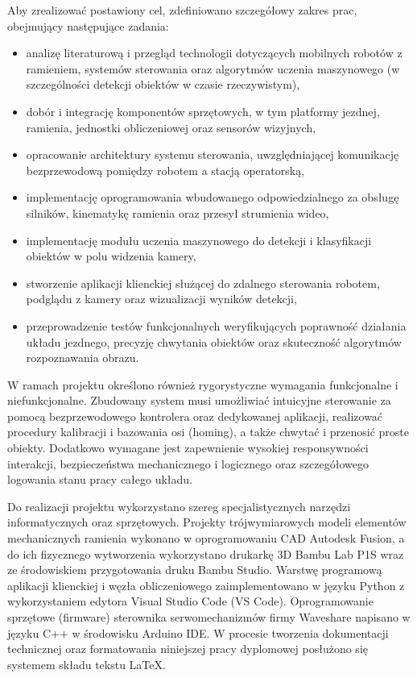 \documentclass[11pt]{extreport}
\begin{document}
Aby zrealizować postawiony cel, zdefiniowano szczegółowy zakres prac, obejmujący następujące zadania:
\begin{itemize}
    \item analizę literaturową i przegląd technologii dotyczących mobilnych robotów z ramieniem, systemów sterowania oraz algorytmów uczenia maszynowego (w szczególności detekcji obiektów w czasie rzeczywistym),
    \item dobór i integrację komponentów sprzętowych, w tym platformy jezdnej, ramienia, jednostki obliczeniowej oraz sensorów wizyjnych,
    \item opracowanie architektury systemu sterowania, uwzględniającej komunikację bezprzewodową pomiędzy robotem a stacją operatorską,
    \item implementację oprogramowania wbudowanego odpowiedzialnego za obsługę silników, kinematykę ramienia oraz przesył strumienia wideo,
    \item implementację modułu uczenia maszynowego do detekcji i klasyfikacji obiektów w polu widzenia kamery,
    \item stworzenie aplikacji klienckiej służącej do zdalnego sterowania robotem, podglądu z kamery oraz wizualizacji wyników detekcji,
    \item przeprowadzenie testów funkcjonalnych weryfikujących poprawność działania układu jezdnego, precyzję chwytania obiektów oraz skuteczność algorytmów rozpoznawania obrazu.
\end{itemize}

W ramach projektu określono również rygorystyczne wymagania funkcjonalne i niefunkcjonalne. Zbudowany system musi umożliwiać intuicyjne sterowanie za pomocą bezprzewodowego kontrolera oraz dedykowanej aplikacji, realizować procedury kalibracji i bazowania osi (homing), a także chwytać i przenosić proste obiekty. Dodatkowo wymagane jest zapewnienie wysokiej responsywności interakcji, bezpieczeństwa mechanicznego i logicznego oraz szczegółowego logowania stanu pracy całego układu.

Do realizacji projektu wykorzystano szereg specjalistycznych narzędzi informatycznych oraz sprzętowych. Projekty trójwymiarowych modeli elementów mechanicznych ramienia wykonano w oprogramowaniu CAD Autodesk Fusion, a do ich fizycznego wytworzenia wykorzystano drukarkę 3D Bambu Lab P1S wraz ze środowiskiem przygotowania druku Bambu Studio. Warstwę programową aplikacji klienckiej i węzła obliczeniowego zaimplementowano w języku Python z wykorzystaniem edytora Visual Studio Code (VS Code). Oprogramowanie sprzętowe (firmware) sterownika serwomechanizmów firmy Waveshare napisano w języku C++ w środowisku Arduino IDE. W procesie tworzenia dokumentacji technicznej oraz formatowania niniejszej pracy dyplomowej posłużono się systemem składu tekstu \LaTeX.
\end{document}
